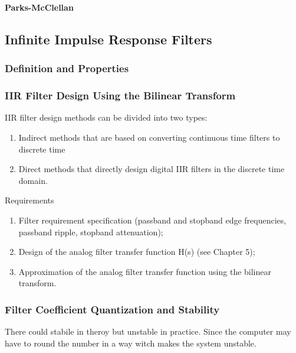 \textbf{Parks-McClellan}

\subsection{Infinite Impulse Response Filters}
\subsubsection{Definition and Properties}

\subsubsection{IIR Filter Design Using the Bilinear Transform}
IIR filter design methods can be divided into two types:
\begin{enumerate}
    \item Indirect methods that are based on converting continuous time filters to discrete time
    \item Direct methods that directly design digital IIR filters in the discrete time domain.
\end{enumerate}



Requirements
\begin{enumerate}
    \item Filter requirement specification (passband and stopband edge frequencies, passband ripple, stopband attenuation);
    \item Design of the analog filter transfer function H(s) (see Chapter 5);
    \item Approximation of the analog filter transfer function using the bilinear transform.
\end{enumerate}


\subsubsection{Filter Coefficient Quantization and Stability}
There could stabile in theroy but unstable in practice. Since the computer may have to 
round the number in a way witch makes the system unstable.

